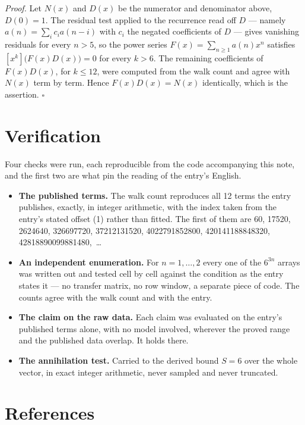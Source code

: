 \documentclass[11pt]{article}
\theoremstyle{definition}
\begin{document}
{\itshape Proof.} Let $N(x)$ and $D(x)$ be the numerator and denominator above, $D(0)=1$. The residual test applied to the recurrence read off $D$ --- namely $a(n) = \sum_i c_i a(n-i)$ with $c_i$ the negated coefficients of $D$ --- gives vanishing residuals for every $n > 5$, so the power series $F(x)=\sum_{n\ge 1}a(n)x^n$ satisfies $[x^k]\bigl(F(x)D(x)\bigr) = 0$ for every $k > 6$. The remaining coefficients of $F(x)D(x)$, for $k \le 12$, were computed from the walk count and agree with $N(x)$ term by term. Hence $F(x)D(x) = N(x)$ identically, which is the assertion. $\square$

\section{Verification}

Four checks were run, each reproducible from the code accompanying this note, and the first two are what pin the reading of the entry's English.

\begin{itemize}

\item {\bfseries The published terms.} The walk count reproduces all 12 terms the entry publishes, exactly, in integer arithmetic, with the index taken from the entry's stated offset (1) rather than fitted. The first of them are 60, 17520, 2624640, 326697720, 37212131520, 4022791852800, 420141188848320, 42818890099881480,~\dots

\item {\bfseries An independent enumeration.} For $n = 1,\dots,2$ every one of the $6^{3n}$ arrays was written out and tested cell by cell against the condition as the entry states it --- no transfer matrix, no row window, a separate piece of code. The counts agree with the walk count and with the entry.

\item {\bfseries The claim on the raw data.} Each claim was evaluated on the entry's published terms alone, with no model involved, wherever the proved range and the published data overlap. It holds there.

\item {\bfseries The annihilation test.} Carried to the derived bound $S = 6$ over the whole vector, in exact integer arithmetic, never sampled and never truncated.

\end{itemize}

\section{References}
\end{document}
